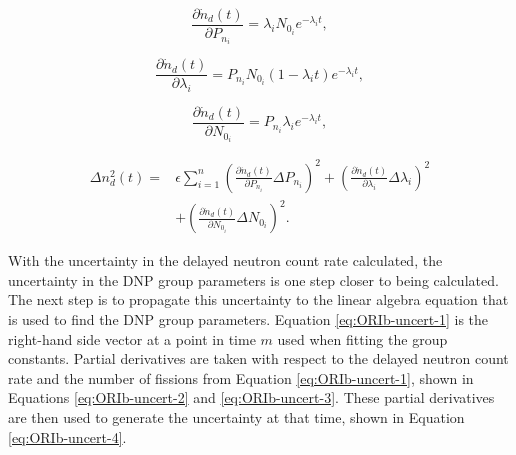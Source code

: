 \documentclass{style/nseJournal}
\begin{document}
\begin{equation}
\frac{\partial \dot{n}_d(t)}{\partial P_{n_i}} = \lambda_i N_{0_i} e^{-\lambda_i t} ,
\label{eq:ORI-uncert-1}
\end{equation}

\begin{equation}
\frac{\partial \dot{n}_d(t)}{\partial \lambda_{i}} = P_{n_i} N_{0_i} (1-\lambda_i t) e^{-\lambda_i t} ,
\label{eq:ORI-uncert-2}
\end{equation}

\begin{equation}
\frac{\partial \dot{n}_d(t)}{\partial N_{0_i}} = P_{n_i} \lambda_i e^{-\lambda_i t} ,
\label{eq:ORI-uncert-3}
\end{equation}



\begin{equation}
\begin{split}
\Delta n_d^2(t)  =&   \epsilon  \sum_{i=1}^n \left( \frac{\partial \dot{n}_d(t)}{\partial P_{n_i}} \Delta P_{n_i} \right)^2 + \left( \frac{\partial \dot{n}_d(t)}{\partial \lambda_{i}} \Delta \lambda_i \right)^2 \\
& +  \left( \frac{\partial \dot{n}_d(t)}{\partial N_{0_i}} \Delta N_{0_i} \right)^2 .
\end{split}
\label{eq:ORI-uncert-4}
\end{equation}

With the uncertainty in the delayed neutron count rate calculated, the uncertainty in the DNP group parameters is one step closer to being calculated.
The next step is to propagate this uncertainty to the linear algebra equation that is used to find the DNP group parameters.
Equation \eqref{eq:ORIb-uncert-1} is the right-hand side vector at a point in time $m$ used when fitting the group constants.
Partial derivatives are taken with respect to the delayed neutron count rate and the number of fissions from Equation \eqref{eq:ORIb-uncert-1}, shown in Equations \eqref{eq:ORIb-uncert-2} and \eqref{eq:ORIb-uncert-3}. These partial derivatives are then used to generate the uncertainty at that time, shown in Equation \eqref{eq:ORIb-uncert-4}.
\end{document}
